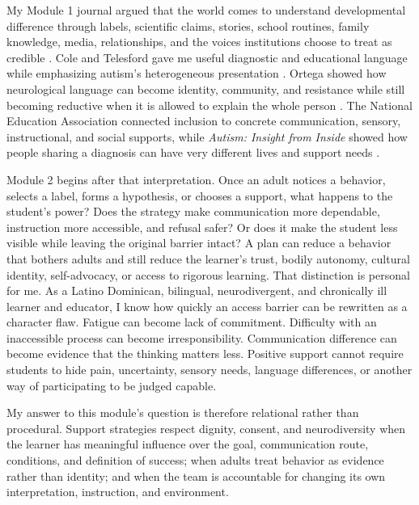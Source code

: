 
My Module 1 journal argued that the world comes to understand developmental difference through labels, scientific claims, stories, school routines, family knowledge, media, relationships, and the voices institutions choose to treat as credible \citep{garciabautista2026module1}. Cole and Telesford gave me useful diagnostic and educational language while emphasizing autism's heterogeneous presentation \citep{cole2023autism}. Ortega showed how neurological language can become identity, community, and resistance while still becoming reductive when it is allowed to explain the whole person \citep{ortega2013cerebralizing}. The National Education Association connected inclusion to concrete communication, sensory, instructional, and social supports, while \textit{Autism: Insight from Inside} showed how people sharing a diagnosis can have very different lives and support needs \citep{nea2020guide,infobase2016inside}.

Module 2 begins after that interpretation. Once an adult notices a behavior, selects a label, forms a hypothesis, or chooses a support, what happens to the student's power? Does the strategy make communication more dependable, instruction more accessible, and refusal safer? Or does it make the student less visible while leaving the original barrier intact? A plan can reduce a behavior that bothers adults and still reduce the learner's trust, bodily autonomy, cultural identity, self-advocacy, or access to rigorous learning. That distinction is personal for me. As a Latino Dominican, bilingual, neurodivergent, and chronically ill learner and educator, I know how quickly an access barrier can be rewritten as a character flaw. Fatigue can become lack of commitment. Difficulty with an inaccessible process can become irresponsibility. Communication difference can become evidence that the thinking matters less. Positive support cannot require students to hide pain, uncertainty, sensory needs, language differences, or another way of participating to be judged capable.

My answer to this module's question is therefore relational rather than procedural. Support strategies respect dignity, consent, and neurodiversity when the learner has meaningful influence over the goal, communication route, conditions, and definition of success; when adults treat behavior as evidence rather than identity; and when the team is accountable for changing its own interpretation, instruction, and environment.
